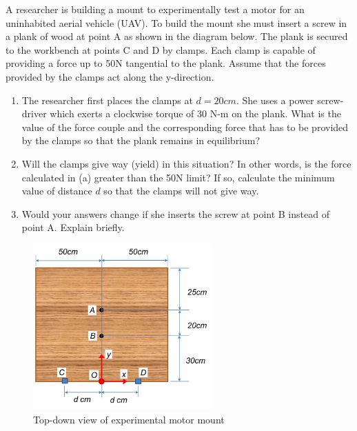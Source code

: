 
A researcher is building a mount to experimentally test a motor for an uninhabited aerial vehicle (UAV).
To build the mount she must insert a screw in a plank of wood at point A as shown in the diagram 
below. The plank is secured to the workbench at points C and D by clamps. Each clamp is capable of
providing a force up to 50N tangential to the plank. Assume that the forces provided by the clamps act along
the y-direction.

\begin{enumerate}
  \item The researcher first places the clamps at $d = 20 cm$. She uses a power screw-driver which exerts a clockwise
torque of 30 N-m on the plank. What is the value of the force couple and the corresponding force that
has to be provided by the clamps so that the plank remains in equilibrium?
  \item Will the clamps give way (yield) in this situation? In other words, is the force calculated in (a) greater
than the 50N limit? If so, calculate the minimum value of distance $d$ so that the clamps will not give way.
  \item Would your answers change if she inserts the screw at point B instead of point A. Explain briefly.
\end{enumerate}


\begin{figure}[ht!]
  \centering
  \includegraphics[height=2.5in]{fig.png}
  \caption*{Top-down view of experimental motor mount}
\end{figure}


